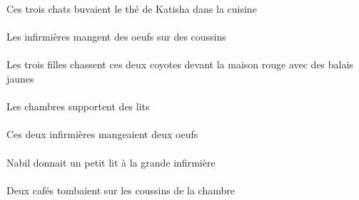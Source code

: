 \begin{exe}
Ces trois chats buvaient le thé de Katisha dans la cuisine
\ex\gll
\INDPlObl{}   \coussinBPlObl{}   \SUR{}   \DEFPlErg{}   \infirmiereAPlErg{}   \INDPlAbs{}   \oeufCPlAbs{}  \mangerVtPrsCPl{}\\
\INDPlOblP{}   \coussinBPlOblP{}   \SURP{}   \DEFPlErgP{}   \infirmiereAPlErgP{}   \INDPlAbsP{}   \oeufCPlAbsP{}  \mangerVtPrsCPlP{}\\
Les infirmières mangent des oeufs sur des coussins
\ex\gll
\INDPlObl{}   \jauneAPl{}   \balaiAPlObl{}   \AVEC{}   \DEFPlErg{}   \troisCPl{}   \filleCPlErg{}   \DEMDuAbs{}    \DEFSgObl{}   \rougeDSg{}   \maisonDSgObl{}   \DEVANT{}   \coyoteCDuAbs{}  \chasserVtPrsCDu{}\\
\INDPlOblP{}   \jauneAPlP{}   \balaiAPlOblP{}   \AVECP{}   \DEFPlErgP{}   \troisCPlP{}   \filleCPlErgP{}   \DEMDuAbsP{}    \DEFSgOblP{}   \rougeDSgP{}   \maisonDSgOblP{}   \DEVANTP{}   \coyoteCDuAbsP{}  \chasserVtPrsCDuP{}\\
Les trois filles chassent ces deux coyotes devant la maison rouge avec des balais jaunes
\ex\gll
\DEFPlErg{}   \chambreBPlErg{}   \INDPlAbs{}   \litDPlAbs{}  \supporterVtPrsDPl{}\\
\DEFPlErgP{}   \chambreBPlErgP{}   \INDPlAbsP{}   \litDPlAbsP{}  \supporterVtPrsDPlP{}\\
Les chambres supportent des lits
\ex\gll
\DEMDuErg{}   \infirmiereADuErg{}   \INDDuAbs{}   \oeufCDuAbs{}  \mangerVtPstCDu{}\\
\DEMDuErgP{}   \infirmiereADuErgP{}   \INDDuAbsP{}   \oeufCDuAbsP{}  \mangerVtPstCDuP{}\\
Ces deux infirmières mangeaient deux oeufs
\ex\gll
\INDSgErg{}   \NabilDSgErg{}    \DEFSgDat{}   \grandASg{}   \infirmiereASgDat{}   \INDSgAbs{}   \petitDSg{}   \litDSgAbs{}  \donnerVdPstDSg{}\\
\INDSgErgP{}   \NabilDSgErgP{}    \DEFSgDatP{}   \grandASgP{}   \infirmiereASgDatP{}   \INDSgAbsP{}   \petitDSgP{}   \litDSgAbsP{}  \donnerVdPstDSgP{}\\
Nabil donnait un petit lit à la grande infirmière
\ex\gll
\INDDuAbs{}   \cafeCDuAbs{}    \DEFPlObl{}    \DEFSgObl{}   \chambreBSgObl{}   \DE{}   \coussinBPlObl{}   \SUR{}  \tomberViPstCDu{}\\
\INDDuAbsP{}   \cafeCDuAbsP{}    \DEFPlOblP{}    \DEFSgOblP{}   \chambreBSgOblP{}   \DEP{}   \coussinBPlOblP{}   \SURP{}  \tomberViPstCDuP{}\\
Deux cafés tombaient sur les coussins de la chambre
\ex\gll
\INDSgAbs{}   \NicoleBSgAbs{}    \DEFPlObl{}    \DEFSgObl{}   \litDSgObl{}   \DE{}   \coussinBPlObl{}   \SUR{}  \tomberViPrsBSg{}\\

\end{exe}
